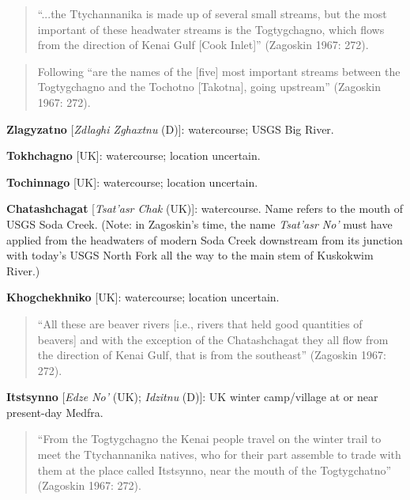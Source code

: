 \begin{hang}
\begin{quote}“...the Ttychannanika is made up of several small streams, but the most important of these headwater streams is the Togtygchagno, which flows from the direction of Kenai Gulf [Cook Inlet]” (Zagoskin 1967: 272).
\end{quote}



\begin{quote}Following “are the names of the [five] most important streams between the Togtygchagno and the Tochotno [Takotna], going upstream” (Zagoskin 1967: 272).
\end{quote}



\textbf{Zlagyzatno} [\textit{Zdlaghi Zghaxtnu} (D)]: watercourse; USGS Big River.



\textbf{Tokhchagno} [UK]: watercourse; location uncertain.



\textbf{Tochinnago} [UK]: watercourse; location uncertain.



\textbf{Chatashchagat} [\textit{Tsat’asr Chak} (UK)]: watercourse. Name refers to the mouth of USGS Soda Creek. (Note: in Zagoskin’s time, the name \textit{Tsat’asr No’} must have applied from the headwaters of modern Soda Creek downstream from its junction with today’s USGS North Fork all the way to the main stem of Kuskokwim River.)



\textbf{Khogchekhniko} [UK]: watercourse; location uncertain.



\begin{quote}“All these are beaver rivers [i.e., rivers that held good quantities of beavers] and with the exception of the Chatashchagat they all flow from the direction of Kenai Gulf, that is from the southeast” (Zagoskin 1967: 272).
\end{quote}



\textbf{Itstsynno} [\textit{Edze No’} (UK); \textit{Idzitnu} (D)]: UK winter camp/village at or near present-day Medfra.



\begin{quote}“From the Togtygchagno the Kenai people travel on the winter trail to meet the Ttychannanika natives, who for their part assemble to trade with them at the place called Itstsynno, near the mouth of the Togtygchatno” (Zagoskin 1967: 272).
\end{quote}




\end{hang}
